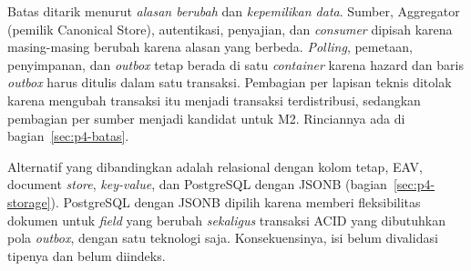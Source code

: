 \begin{jawaban}
Batas ditarik menurut \emph{alasan berubah} dan \emph{kepemilikan data}. Sumber, Aggregator (pemilik Canonical Store),
autentikasi, penyajian, dan \emph{consumer} dipisah karena masing-masing berubah karena alasan yang berbeda. \emph{Polling},
pemetaan, penyimpanan, dan \emph{outbox} tetap berada di satu \emph{container} karena hazard dan baris \emph{outbox} harus ditulis dalam satu
transaksi. Pembagian per lapisan teknis ditolak karena mengubah transaksi itu menjadi transaksi terdistribusi, sedangkan
pembagian per sumber menjadi kandidat untuk M2. Rinciannya ada di bagian~\ref{sec:p4-batas}.
\end{jawaban}

\begin{jawaban}
Alternatif yang dibandingkan adalah relasional dengan kolom tetap, EAV, document \emph{store}, \emph{key-value}, dan PostgreSQL dengan
JSONB (bagian~\ref{sec:p4-storage}). PostgreSQL dengan JSONB dipilih karena memberi fleksibilitas dokumen untuk \emph{field} yang
berubah \emph{sekaligus} transaksi ACID yang dibutuhkan pola \emph{outbox}, dengan satu teknologi saja. Konsekuensinya, isi
 belum divalidasi tipenya dan belum diindeks.
\end{jawaban}
